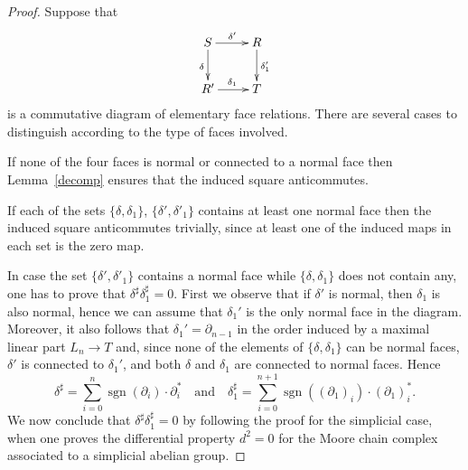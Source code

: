 \documentclass[a4paper]{amsart}
\theoremstyle{plain}
\theoremstyle{definition}
\theoremstyle{remark}
\DeclareMathOperator{\sgn}{sgn}
\newcommand{\To}{\longrightarrow}
\numberwithin{equation}{section}
\numberwithin{figure}{section}
\begin{document}
\begin{proof} Suppose that
    \[
        \xymatrix{
            S\ar[r]^{\delta'}\ar[d]_\delta & R \ar[d]^{\delta'_1} \\
            R'\ar[r]^{\delta_1} & T }
    \]
    is a commutative diagram of elementary face relations. There are several cases to distinguish according to the type of faces involved.

    If none of the four faces is normal or connected to a normal face then Lemma~\ref{decomp} ensures that the induced square anticommutes.

    If each of the sets $\{\delta,\delta_1\}$, $\{\delta', \delta'_1\}$ contains at least one normal face then the induced square anticommutes trivially, since at least one of the induced maps in each set is the zero map.

    In case the set $\{\delta',\delta'_1\}$ contains a normal face while $\{\delta, \delta_1\}$ does not contain any, one has to prove that $\delta^\sharp\delta_1^\sharp=0$. First we observe that if $\delta'$ is normal, then $\delta_1$ is also normal, hence we can assume that
    $\delta_1'$ is the only normal face in the diagram. Moreover, it also follows that $\delta_1'=\partial_{n-1}$ in the order induced by a maximal linear part $L_n\To T$ and, since none of the elements of $\{\delta,\delta_1\}$ can be normal faces, $\delta'$ is connected to $\delta_1'$, and both $\delta$ and $\delta_1$ are connected to normal faces. Hence
    \[
        \delta^\sharp=\sum_{i=0}^n\sgn(\partial_i)\cdot\partial_i^*\quad\mbox{and}\quad
        \delta_1^\sharp=\sum_{i=0}^{n+1}\sgn((\partial_1)_i)\cdot(\partial_1)_i^*.
    \]
    We now conclude that $\delta^\sharp\delta_1^\sharp=0$ by following the
    proof for the simplicial case, when one proves the differential
    property $d^2=0$ for the Moore chain complex associated to a
    simplicial abelian group.


\end{proof}
\end{document}
